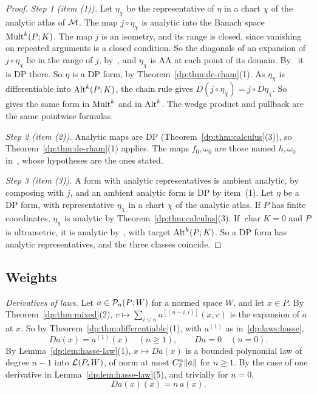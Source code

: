 \begin{proof}
\emph{Step 1 (item (1)).} Let $\eta_\chi$ be the representative of $\eta$ in a chart $\chi$ of the analytic atlas of $\mathcal M$. The map $j\circ\eta_\chi$ is analytic into the Banach space $\operatorname{Mult}^k(P;K)$. The map $j$ is an isometry, and its range is closed, since vanishing on repeated arguments is a closed condition. So the diagonals of an expansion of $j\circ\eta_\chi$ lie in the range of $j$, by~\cite[Theorem~2.3]{I}, and $\eta_\chi$ is AA at each point of its domain. By~\cite[Proposition~14.9(1)]{I} it is DP there. So $\eta$ is a DP form, by Theorem~\ref{dp:thm:de-rham}(1). As $\eta_\chi$ is differentiable into $\operatorname{Alt}^k(P;K)$, the chain rule gives $D(j\circ\eta_\chi)=j\circ D\eta_\chi$. So~\cite[(10.3)]{I} gives the same form in $\operatorname{Mult}^k$ and in $\operatorname{Alt}^k$. The wedge product and pullback are the same pointwise formulas.

\emph{Step 2 (item (2)).} Analytic maps are DP (Theorem~\ref{dp:thm:calculus}(3)), so Theorem~\ref{dp:thm:de-rham}(1) applies. The maps $f_0,\omega_0$ are those named $h,\omega_0$ in~\cite[Proposition~10.3(2)]{I}, whose hypotheses are the ones stated.

\emph{Step 3 (item (3)).} A form with analytic representatives is ambient analytic, by composing with $j$, and an ambient analytic form is DP by item~(1). Let $\eta$ be a DP form, with representative $\eta_\chi$ in a chart $\chi$ of the analytic atlas. If $P$ has finite coordinates, $\eta_\chi$ is analytic by Theorem~\ref{dp:thm:calculus}(3). If $\operatorname{char}K=0$ and $P$ is ultrametric, it is analytic by~\cite[Proposition~14.40(2)]{I}, with target $\operatorname{Alt}^k(P;K)$. So a DP form has analytic representatives, and the three classes coincide.
\end{proof}

\subsection{Weights}\label{dp:ssec:weights}

\emph{Derivatives of laws.} Let $a\in\mathcal P_n(P;W)$ for a normed space $W$, and let $x\in P$. By Theorem~\ref{dp:thm:mixed}(2), $v\mapsto\sum_{i\le n}a^{[(n-i,i)]}(x,v)$ is the expansion of $a$ at $x$. So by Theorem~\ref{dp:thm:differentiable}(1), with $a^{(1)}$ as in~\eqref{dp:laws:hasse},
\begin{equation}\label{dp:f:law-derivative}
 Da(x)=a^{(1)}(x)\quad(n\ge1),\qquad Da=0\quad(n=0).
\end{equation}
By Lemma~\ref{dp:lem:hasse-law}(1), $x\mapsto Da(x)$ is a bounded polynomial law of degree $n-1$ into $\mathcal L(P,W)$, of norm at most $C_2^n\lVert a\rVert$ for $n\ge1$. By the case of one derivative in Lemma~\ref{dp:lem:hasse-law}(5), and trivially for $n=0$,
\begin{equation}\label{dp:f:law-euler}
 Da(x)(x)=n\,a(x).
\end{equation}


